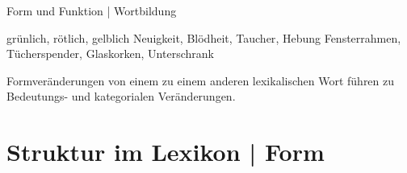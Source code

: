 \begin{frame}
  {Form und Funktion | Wortbildung}
  \onslide<+->
  \onslide<+->
  \begin{exe}
    \ex grün\alert{lich}, röt\alert{lich}, gelb\alert{lich}
    \onslide<+->
    \ex Neu\alert{igkeit}, Blöd\alert{heit}, Tauch\alert{er}, Heb\alert{ung}
    \onslide<+->
    \ex Fenster\alert{rahmen}, Tücher\alert{spender}, Glas\alert{korken}, Unter\alert{schrank}
  \end{exe}
  \onslide<+->
  \Zeile
  Formveränderungen von einem zu einem anderen lexikalischen Wort führen zu Bedeutungs- und kategorialen Veränderungen.
\end{frame}


\section{Struktur im Lexikon | Form}

